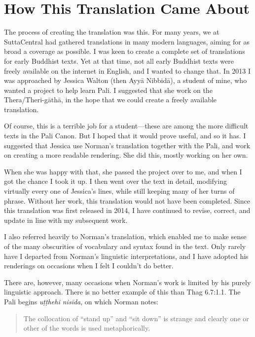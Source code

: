 \documentclass[12pt,openany]{book}%
\begin{document}
\section*{How This Translation Came About}

The process of creating the translation was this. For many years, we at SuttaCentral had gathered translations in many modern languages, aiming for as broad a coverage as possible. I was keen to create a complete set of translations for early Buddhist texts. Yet at that time, not all early Buddhist texts were freely available on the internet in English, and I wanted to change that. In 2013 I was approached by Jessica Walton (then \textsanskrit{Ayyā} \textsanskrit{Nibbidā}), a student of mine, who wanted a project to help learn Pali. I suggested that she work on the Thera/Theri-\textsanskrit{gāthā}, in the hope that we could create a freely available translation.

Of course, this is a terrible job for a student—these are among the more difficult texts in the Pali Canon. But I hoped that it would prove useful, and so it has. I suggested that Jessica use Norman’s translation together with the Pali, and work on creating a more readable rendering. She did this, mostly working on her own.

When she was happy with that, she passed the project over to me, and when I got the chance I took it up. I then went over the text in detail, modifying virtually every one of Jessica’s lines, while still keeping many of her turns of phrase. Without her work, this translation would not have been completed. Since this translation was first released in 2014, I have continued to revise, correct, and update in line with my subsequent work.

I also referred heavily to Norman’s translation, which enabled me to make sense of the many obscurities of vocabulary and syntax found in the text. Only rarely have I departed from Norman’s linguistic interpretations, and I have adopted his renderings on occasions when I felt I couldn’t do better.

There are, however, many occasions when Norman’s work is limited by his purely linguistic approach. There is no better example of this than Thag 6.7:1.1. The Pali begins \textit{\textsanskrit{uṭṭhehi} \textsanskrit{nisīda}}, on which Norman notes:

\begin{quotation}%
The collocation of “stand up” and “sit down” is strange and clearly one or other of the words is used metaphorically.

%
\end{quotation}
\end{document}
